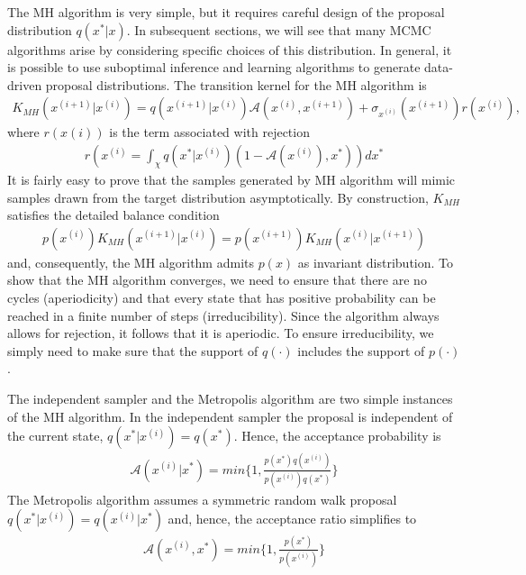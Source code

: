 The MH algorithm is very simple, but it requires careful design of the proposal distribution $q(x^* | x)$. In subsequent sections, we will see that many MCMC algorithms arise by considering specific choices of this distribution. In general, it is possible to use suboptimal inference and learning algorithms to generate data-driven proposal distributions.
The transition kernel for the MH algorithm is
\begin{align*}
  K_{MH}(x^{(i + 1)} | x^{(i)}) = q(x^{(i + 1)} | x^{(i)}) \mathscr{A}(x^{(i)}, x^{(i + 1)}) + \sigma_{x^{(i)}} (x^{(i + 1)}) r (x^{(i)}),
\end{align*}  
where $r(x(i))$ is the term associated with rejection
\begin{align*}
  r(x^{(i)} = \int_{\chi} q(x^* | x^{(i)})(1 - \mathscr{A}(x^{(i)}), x^*))dx^*
\end{align*}
It is fairly easy to prove that the samples generated by MH algorithm will mimic samples
drawn from the target distribution asymptotically. By construction, $K_{MH}$ satisﬁes the detailed
balance condition
\begin{align*}
  p(x^{(i)})K_{MH}(x^{(i + 1)} | x^{(i)}) = p(x^{(i + 1)})K_{MH}(x^{(i)} | x^{(i + 1)})
\end{align*}
and, consequently, the MH algorithm admits $p(x)$ as invariant distribution. To show that the MH algorithm converges, we need to ensure that there are no cycles (aperiodicity)
and that every state that has positive probability can be reached in a ﬁnite number of steps (irreducibility). Since the algorithm always allows for rejection, it follows that it is aperiodic. To ensure irreducibility, we simply need to make sure that the support of $q(\cdotp)$ includes the support of $p(\cdotp)$.

The independent sampler and the Metropolis algorithm are two simple instances of the MH algorithm. In the independent sampler the proposal is independent of the current state, $q(x^* | x^{(i)}) = q(x^*)$. Hence, the acceptance probability is
\begin{align*}
  \mathscr{A}(x^{(i)} | x^*) = min \{1, \frac{p(x^*)q(x^{(i)})}{p(x^{(i)})q(x^*)}\}
\end{align*}
The Metropolis algorithm assumes a symmetric random walk proposal $q(x^* | x^{(i)}) = q(x^{(i)} | x^*)$ and, hence, the acceptance ratio simplifies to
\begin{align*}
  \mathscr{A}(x^{(i)}, x^*) = min \{ 1, \frac{p(x^*)}{p(x^{(i)})} \}
\end{align*}

